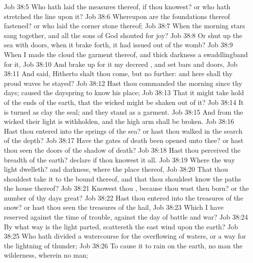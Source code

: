 \vs Job 38:5 Who hath laid the measures thereof, if thou knowest? or who hath stretched the line upon it?
\vs Job 38:6 Whereupon are the foundations thereof fastened? or who laid the corner stone thereof;
\vs Job 38:7 When the morning stars sang together, and all the sons of God shouted for joy?
\vs Job 38:8 Or  shut up the sea with doors, when it brake forth,  it had issued out of the womb?
\vs Job 38:9 When I made the cloud the garment thereof, and thick darkness a swaddlingband for it,
\vs Job 38:10 And brake up for it my decreed , and set bars and doors,
\vs Job 38:11 And said, Hitherto shalt thou come, but no further: and here shall thy proud waves be stayed?
\vs Job 38:12 Hast thou commanded the morning since thy days;  caused the dayspring to know his place;
\vs Job 38:13 That it might take hold of the ends of the earth, that the wicked might be shaken out of it?
\vs Job 38:14 It is turned as clay  the seal; and they stand as a garment.
\vs Job 38:15 And from the wicked their light is withholden, and the high arm shall be broken.
\vs Job 38:16 Hast thou entered into the springs of the sea? or hast thou walked in the search of the depth?
\vs Job 38:17 Have the gates of death been opened unto thee? or hast thou seen the doors of the shadow of death?
\vs Job 38:18 Hast thou perceived the breadth of the earth? declare if thou knowest it all.
\vs Job 38:19 Where  the way  light dwelleth? and  darkness, where  the place thereof,
\vs Job 38:20 That thou shouldest take it to the bound thereof, and that thou shouldest know the paths  the house thereof?
\vs Job 38:21 Knowest thou , because thou wast then born? or  the number of thy days  great?
\vs Job 38:22 Hast thou entered into the treasures of the snow? or hast thou seen the treasures of the hail,
\vs Job 38:23 Which I have reserved against the time of trouble, against the day of battle and war?
\vs Job 38:24 By what way is the light parted,  scattereth the east wind upon the earth?
\vs Job 38:25 Who hath divided a watercourse for the overflowing of waters, or a way for the lightning of thunder;
\vs Job 38:26 To cause it to rain on the earth,  no man  the wilderness, wherein  no man;
